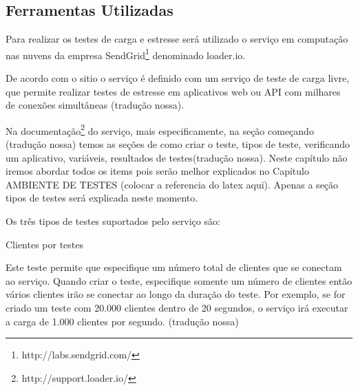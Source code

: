 




\subsection{Ferramentas Utilizadas}
\label{ferramentas-utilizadas-para-testes}
  
  Para realizar os testes de carga e estresse será utilizado o serviço em computação nas nuvens
  da empresa SendGrid\footnote{http://labs.sendgrid.com/} denominado loader.io.
  
  De acordo com o sitio o serviço é definido com um serviço de teste de carga livre,
  que permite realizar testes de estresse em aplicativos web ou \ac{API} com milhares de conexões simultâneas
  (tradução nossa).
  
  Na documentação\footnote{http://support.loader.io/} do serviço, mais especificamente, na seção começando (tradução nossa)
  temos as seções de como criar o teste, tipos de teste, verificando um aplicativo, variáveis,
  resultados de testes(tradução nossa). Neste capítulo não iremos abordar todos os items pois serão melhor explicados
  no Capítulo AMBIENTE DE TESTES (colocar a referencia do latex aqui). Apenas a seção tipos de testes será explicada neste 
  momento.
  
  Os três tipos de testes suportados pelo serviço são:
  
  Clientes por testes
  
  Este teste permite que especifique um número total de clientes que se conectam ao serviço. Quando criar o teste,
  especifique somente um número de clientes então vários clientes irão se conectar ao longo da duração do teste. 
  Por exemplo, se for criado um teste com 20.000 clientes dentro de 20 segundos, o serviço irá executar a carga de 
  1.000 clientes por segundo. (tradução nossa)
  
